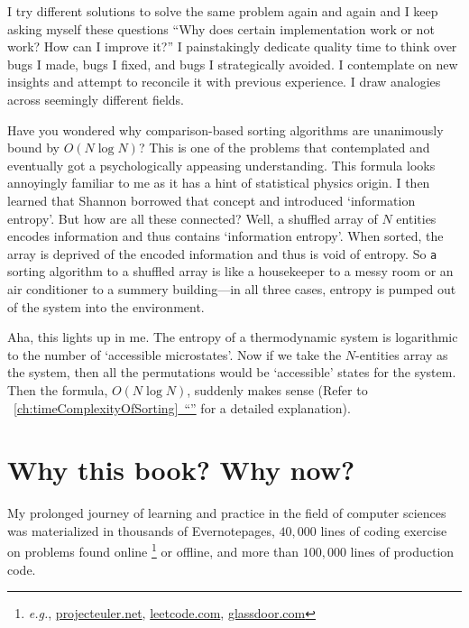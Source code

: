 \documentclass[oneside,11pt]{book}
\theoremstyle{definition}
\theoremstyle{remark}
\newcommand*{\fullref}[1]{\hyperref[{#1}]{\mbox{\autoref*{#1}~}``\nameref*{#1}''}}
\begin{document}
I try different solutions to solve the same problem again and again and
I keep asking myself these questions ``Why does certain implementation work or not work?
How can I improve it?''
I painstakingly dedicate quality time to think over bugs I made, bugs I fixed,
and bugs I strategically avoided.
I contemplate on new insights and attempt to reconcile it with previous experience.
I draw analogies across seemingly different fields.


Have you wondered why comparison-based sorting algorithms are unanimously bound by $O(N \log N)$?
This is one of the problems that contemplated and eventually got a psychologically
appeasing understanding.
This formula looks annoyingly familiar to me as it has a hint of statistical physics origin.
I then learned that Shannon borrowed that concept and introduced `information
entropy'\cite{Shannon-mathematical-1948}.
But how are all these connected?
Well, a shuffled array of $N$ entities encodes information and thus contains `information entropy'.
When sorted, the array is deprived of the encoded information and thus is void of entropy.
So \texttt{a} sorting algorithm to a shuffled array is like a
housekeeper to a messy room or an air conditioner to a summery building---in all three cases,
entropy is pumped out of the system into the environment.


Aha, this lights up in me.
The entropy of a thermodynamic system is logarithmic to the number of `accessible microstates'.
Now if we take the $N$-entities array as the system, then all the permutations would be
`accessible' states for the system.
Then the formula, $O(N \log N)$, suddenly makes sense
(Refer to ~\fullref{ch:timeComplexityOfSorting} for a detailed explanation).


\section{Why this book?
Why now?}\label{sec:whyThisBook}

My prolonged journey of learning and practice in the field of computer sciences was
materialized in thousands of Evernote\textregistered pages, $40,000$
lines of coding exercise on problems found online \footnote{\textit{e.g.},
\url{projecteuler.net}, \url{leetcode.com}, \url{glassdoor.com}} or offline,
and more than $100,000$ lines of production code.
\end{document}
